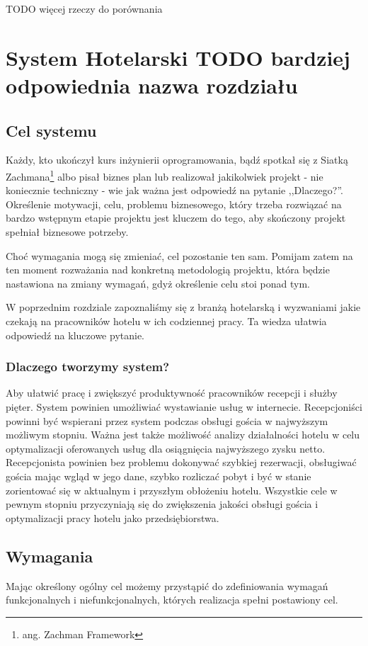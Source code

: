\documentclass[a4paper,onecolumn,oneside,11pt,wide,floatssmall]{mwrep}
\theoremstyle{definition}
\theoremstyle{plain}%
\theoremstyle{remark}
\begin{document}
TODO więcej rzeczy do porównania

\chapter{System Hotelarski TODO bardziej odpowiednia nazwa rozdziału}

\section{Cel systemu}
Każdy, kto ukończył kurs inżynierii oprogramowania, bądź spotkał się z Siatką Zachmana\footnote{ang. Zachman Framework}
 \cite{zachman1986framework} albo pisał biznes plan lub realizował jakikolwiek projekt - nie koniecznie techniczny -  
 wie jak ważna jest odpowiedź na pytanie ,,Dlaczego?''. Określenie motywacji, celu, problemu biznesowego, który trzeba 
 rozwiązać na bardzo wstępnym etapie projektu jest kluczem do tego, aby skończony projekt spełniał biznesowe potrzeby.

Choć wymagania mogą się zmieniać, cel pozostanie ten sam. Pomijam zatem na ten moment rozważania nad konkretną 
metodologią projektu, która będzie nastawiona na zmiany wymagań, gdyż określenie celu stoi ponad tym.

W poprzednim rozdziale zapoznaliśmy się z branżą hotelarską i wyzwaniami jakie czekają na pracowników hotelu w ich 
codziennej pracy. Ta wiedza ułatwia odpowiedź na kluczowe pytanie.

\subsection{Dlaczego tworzymy system?}
Aby ułatwić pracę i zwiększyć produktywność pracowników recepcji i służby pięter. System powinien 
umożliwiać wystawianie usług w internecie. Recepcjoniści powinni być wspierani przez system podczas obsługi gościa w 
najwyższym możliwym stopniu. Ważna jest także możliwość analizy działalności hotelu w celu optymalizacji oferowanych 
usług dla osiągnięcia najwyższego zysku netto. Recepcjonista powinien bez problemu dokonywać szybkiej rezerwacji, 
obsługiwać gościa mając wgląd w jego dane, szybko rozliczać pobyt i być w stanie zorientować się w aktualnym i 
przyszłym obłożeniu hotelu. Wszystkie cele w pewnym stopniu przyczyniają się do zwiększenia jakości obsługi gościa i 
optymalizacji pracy hotelu jako przedsiębiorstwa.

\section{Wymagania}
Mając określony ogólny cel możemy przystąpić do zdefiniowania wymagań funkcjonalnych i niefunkcjonalnych, których realizacja spełni postawiony cel.
\end{document}
